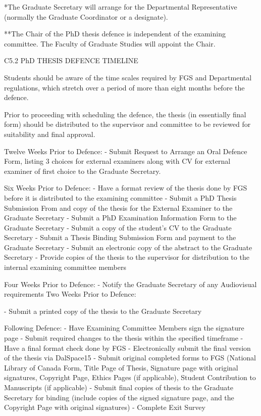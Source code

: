 *The Graduate Secretary will arrange for the Departmental Representative (normally the Graduate Coordinator or a designate).

**The Chair of the PhD thesis defence is independent of the examining committee. The Faculty of Graduate Studies will appoint the Chair.

C5.2	PhD THESIS DEFENCE TIMELINE

Students should be aware of the time scales required by FGS and Departmental regulations, which stretch over a period of more than eight months before the defence.

Prior to proceeding with scheduling the defence, the thesis (in essentially final form) should be distributed to the supervisor and committee to be reviewed for suitability and final approval.

Twelve Weeks Prior to Defence:
-	Submit Request to Arrange an Oral Defence Form, listing 3 choices for external examiners along with CV for external examiner of first choice to the Graduate Secretary.

Six Weeks Prior to Defence:
-	Have a format review of the thesis done by FGS before it is distributed to the examining committee
-	Submit a PhD Thesis Submission From and copy of the thesis for the External Examiner to the Graduate Secretary
-	Submit a PhD Examination Information Form to the Graduate Secretary
-	Submit a copy of the student’s CV to the Graduate Secretary
-	Submit a Thesis Binding Submission Form and payment to the Graduate Secretary
-	Submit an electronic copy of the abstract to the Graduate Secretary
-	Provide copies of the thesis to the supervisor for distribution to the internal examining committee members

Four Weeks Prior to Defence:
-	Notify the Graduate Secretary of any Audiovisual requirements Two Weeks Prior to Defence:
 

-	Submit a printed copy of the thesis to the Graduate Secretary

Following Defence:
-	Have Examining Committee Members sign the signature page
-	Submit required changes to the thesis within the specified timeframe
-	Have a final format check done by FGS
-	Electronically submit the final version of the thesis via DalSpace15
-	Submit original completed forms to FGS (National Library of Canada Form, Title Page of Thesis, Signature page with original signatures, Copyright Page, Ethics Pages (if applicable), Student Contribution to Manuscripts (if applicable)
-	Submit final copies of thesis to the Graduate Secretary for binding (include copies of the signed signature page, and the Copyright Page with original signatures)
-	Complete Exit Survey

